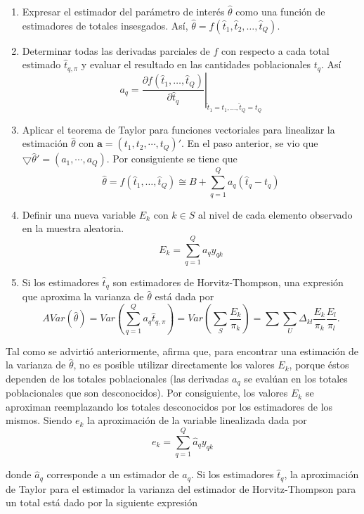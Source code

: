 \documentclass[
  10pt,
  spanish,
]{book}
\providecommand{\tightlist}{%
  \setlength{\itemsep}{0pt}\setlength{\parskip}{0pt}}
\begin{document}
\begin{enumerate}
\def\labelenumi{\arabic{enumi}.}
\tightlist
\item
  Expresar el estimador del parámetro de interés \(\hat{\theta}\) como una función de estimadores de totales insesgados. Así, \(\hat{\theta}=f(\hat{t}_1, \hat{t}_2,\ldots,\hat{t}_Q)\).
\item
  Determinar todas las derivadas parciales de \(f\) con respecto a cada total estimado \(\hat{t}_{q,\pi}\) y evaluar el resultado en las cantidades poblacionales \(t_q\). Así
  \[
  a_q=\left.\dfrac{\partial f(\hat{t}_1,\ldots,\hat{t}_Q)}{\partial \hat{t}_{q}}\right|_{\hat{t}_1=t_1,\ldots,\hat{t}_Q=t_Q}
  \]
\item
  Aplicar el teorema de Taylor para funciones vectoriales para linealizar la estimación \(\hat{\theta}\) con \(\mathbf{a}=(t_1,t_2,\cdots,t_Q)'\). En el paso anterior, se vio que \(\bigtriangledown\hat{\theta}'=(a_1,\cdots,a_Q)\). Por consiguiente se tiene que
  \[
  \hat{\theta}=f(\hat{t}_1,\ldots,\hat{t}_Q) \cong B+\sum_{q=1}^Qa_q(\hat{t}_{q}-t_q)
  \]
\item
  Definir una nueva variable \(E_k\) con \(k\in S\) al nivel de cada elemento observado en la muestra aleatoria.
  \[
  E_k=\sum_{q=1}^Qa_qy_{qk}
  \]
\item
  Si los estimadores \(\hat{t}_{q}\) son estimadores de Horvitz-Thompson, una expresión que aproxima la varianza de \(\hat{\theta}\) está dada por
  \[
  AVar(\hat{\theta})=Var\left(\sum_{q=1}^Qa_q\hat{t}_{q,\pi}\right)
  =Var\left(\sum_S\frac{E_k}{\pi_k}\right)=\sum\sum_U\Delta_{kl}\frac{E_k}{\pi_k}\frac{E_l}{\pi_l}.
  \]
\end{enumerate}

Tal como se advirtió anteriormente, \citet{Gutierrez_2016} afirma que, para encontrar una estimación de la varianza de \(\hat{\theta}\), no es posible utilizar directamente los valores \(E_k\), porque éstos dependen de los totales poblacionales (las derivadas \(a_q\) se evalúan en los totales poblacionales que son desconocidos). Por consiguiente, los valores \(E_k\) se aproximan reemplazando los totales desconocidos por los estimadores de los mismos. Siendo \(e_k\) la aproximación de la variable linealizada dada por
\[
e_k=\sum_{q=1}^Q\hat{a}_qy_{qk}
\]

donde \(\hat{a}_q\) corresponde a un estimador de \(a_q\). Si los estimadores \(\hat{t}_{q}\), la aproximación de Taylor para el estimador la varianza del estimador de Horvitz-Thompson para un total está dado por la siguiente expresión
\end{document}
